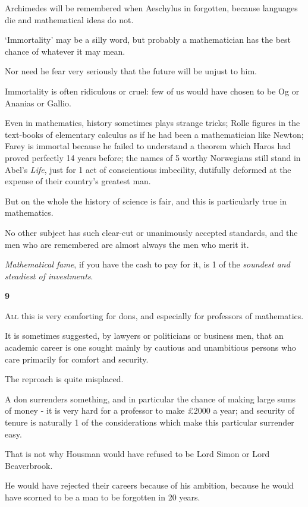 \documentclass{article}
\numberwithin{equation}{section}
\begin{document}
Archimedes will be remembered when Aeschylus in forgotten, because languages die and mathematical ideas do not.

`Immortality' may be a silly word, but probably a mathematician has the best chance of whatever it may mean.

%
Nor need he fear very seriously that the future will be unjust to him.

Immortality is often ridiculous or cruel: few of us would have chosen to be Og or Ananias or Gallio.

Even in mathematics, history sometimes plays strange tricks; Rolle figures in the text-books of elementary calculus as if he had been a mathematician like Newton; Farey is immortal because he failed to understand a theorem which Haros had proved perfectly 14 years before; the names of 5 worthy Norwegians still stand in Abel's \textit{Life}, just for 1 act of conscientious imbecility, dutifully deformed at the expense of their country's greatest man.

But on the whole the history of science is fair, and this is particularly true in mathematics.

No other subject has such clear-cut or unanimously accepted standards, and the men who are remembered are almost always the men who merit it.

\textit{Mathematical fame}, if you have the cash to pay for it, is 1 of the \textit{soundest and steadiest of investments}.

\begin{center}
    \large\textbf{9}
\end{center}
\textsc{All} this is very comforting for dons, and especially for professors of mathematics.

It is sometimes suggested, by lawyers or politicians or business men, that an academic career is one sought mainly by cautious and unambitious persons who care primarily for comfort and security.

The reproach is quite misplaced.

A don surrenders something, and in particular the chance of making large sums of money - it is very hard for a professor to make \pounds2000 a year; and security of tenure is naturally 1 of the considerations which make this particular surrender easy.

That is not why Housman would have refused to be Lord Simon or Lord Beaverbrook.

He would have rejected their careers because of his ambition, because he would have scorned to be a man to be forgotten in 20 years.
\end{document}
